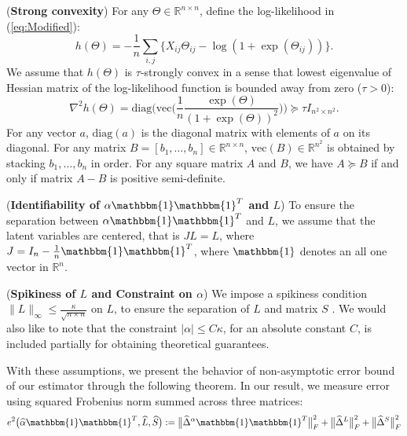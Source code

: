 \documentclass[AMS,STIX1COL]{WileyNJD-v2}
\begin{document}
{\begin{assumption}(\textbf{Strong convexity})  \label{Ass:1}
For any $\Theta \in \mathbb{R}^{n\times n}$, define the log-likelihood in (\ref{eq:Modified}):
$$
h(\Theta) = -\frac{1}{n}\sum_{i,j} \big\{ X_{ij}\Theta_{ij} - \log(1+\exp(\Theta_{ij})) \big\}.
$$
We assume that $h(\Theta)$ is $\tau$-strongly convex in a sense that lowest eigenvalue of Hessian matrix of the log-likelihood function is bounded away from zero ($\tau > 0$):
\[
\nabla^{2}h(\Theta) = \mbox{diag}\Big(\mbox{vec}\Big(\frac{1}{n}\frac{\exp(\Theta)}{(1+\exp(\Theta))^{2}}
\Big)\Big) \succcurlyeq \tau I_{n^{2} \times n^{2}}.
\]
For any vector $a$, $\mbox{diag}(a)$ is the diagonal matrix with elements of $a$ on its diagonal.
For any matrix $B=[b_1,\dots,b_n]\in\mathbb{R}^{n \times n}$, $\mbox{vec}(B)\in\mathbb{R}^{n^2}$ is obtained by stacking $ b_1,\dots, b_{n}$ in order.
For any square matrix $A$ and $B$, we have $ A \succcurlyeq B $ if and only if matrix $A-B$ is positive semi-definite.
\end{assumption}

\begin{assumption} (\textbf{Identifiability of $\alpha\mathbbm{1}\mathbbm{1}^T$ and $L$}) \label{Ass:2}
To ensure the separation between $\alpha\mathbbm{1}\mathbbm{1}^T$ and $L$, we assume that the latent variables are centered, that is $JL=L$, where $J=I_{n}-\frac{1}{n}\mathbbm{1}\mathbbm{1}^T$, where $\mathbbm{1}$ denotes an all one vector in $\mathbb{R}^{n}$.
\end{assumption}

\begin{assumption} (\textbf{Spikiness of $L$ and Constraint on $\alpha$}) \label{Ass:3}
We impose a spikiness condition $\|L\|_{\infty}\leq\frac{\kappa}{\sqrt{n \times n}}$ on $L$, to ensure the separation of $L$ and matrix $S$ \cite{agarwal2012noisy}.
We would also like to note that the constraint $|\alpha|\leq C\kappa$, for an absolute constant $C$, is included partially for obtaining theoretical guarantees.
\end{assumption}

With these assumptions, we present the behavior of non-asymptotic error bound of our estimator through the following theorem. In our result, we measure error using squared Frobenius norm summed across three matrices:
\[
    e^{2}\big(\widehat{\alpha}\mathbbm{1}\mathbbm{1}^T,\widehat{L},\widehat{S}\big)
    :=\big\|\widehat{\Delta}^{\alpha}\mathbbm{1}\mathbbm{1}^T\big\|_{F}^{2} + \big\|\widehat{\Delta}^{L}\big\|_{F}^{2} + \big\|\widehat{\Delta}^{S}\big\|_{F}^{2}
\]

}
\end{document}
